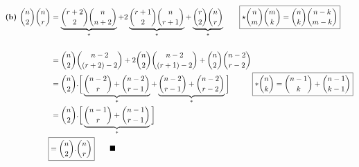 
\begin{align*}
  \text{\bf (b) } \binom{n}{2} \binom{n}{r} & = \underbrace{\binom{r+2}{2} \binom{n}{n+2}}_{\star} + 2\underbrace{\binom{r+1}{2}\binom{n}{r+1}}_{\star} + \underbrace{\binom{r}{2} \binom{n}{r}}_{\star}  \qquad \boxed{\star \binom{n}{m} \binom{m}{k} = \binom{n}{k}\binom{n-k}{m-k}} \\\\
  & = \binom{n}{2} \binom{n-2}{(r+2)-2} + 2\binom{n}{2}\binom{n-2}{(r+1)-2} + \binom{n}{2}\binom{n-2}{r-2} \\
  & = \binom{n}{2}.\bigg[ \underbrace{\binom{n-2}{r} + \binom{n-2}{r-1}}_{\ast} + \underbrace{\binom{n-2}{r-1} + \binom{n-2}{r-2}}_{\ast} \bigg] \qquad \Aboxed{\ast \binom{n}{k} = \binom{n-1}{k} + \binom{n-1}{k-1}} \\
  & = \binom{n}{2}.\bigg[\underbrace{\binom{n-1}{r} + \binom{n-1}{r-1}}_{\ast}\bigg] \\
  \Aboxed{ & = \binom{n}{2}.\binom{n}{r} } \qquad \blacksquare \\
\end{align*}

